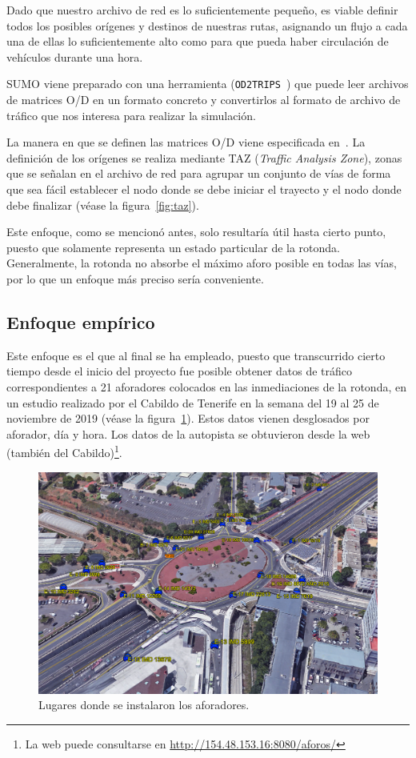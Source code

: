 Dado que nuestro archivo de red es lo suficientemente pequeño, es viable definir todos los posibles orígenes y destinos de nuestras rutas, asignando un flujo a cada una de ellas lo suficientemente alto como para que pueda haber circulación de vehículos durante una hora.

SUMO viene preparado con una herramienta (\texttt{OD2TRIPS}~\cite{noauthor_od2trips_nodate}) que puede leer archivos de matrices O/D en un formato concreto y convertirlos al formato de archivo de tráfico que nos interesa para realizar la simulación.

La manera en que se definen las matrices O/D viene especificada en~\cite{noauthor_demandimporting_nodate}. La definición de los orígenes se realiza mediante TAZ (\textit{Traffic Analysis Zone}), zonas que se señalan en el archivo de red para agrupar un conjunto de vías de forma que sea fácil establecer el nodo donde se debe iniciar el trayecto y el nodo donde debe finalizar (véase la figura~\ref{fig:taz}).

Este enfoque, como se mencionó antes, solo resultaría útil hasta cierto punto, puesto que solamente representa un estado particular de la rotonda. Generalmente, la rotonda no absorbe el máximo aforo posible en todas las vías, por lo que un enfoque más preciso sería conveniente.

\subsection{Enfoque empírico}

Este enfoque es el que al final se ha empleado, puesto que transcurrido cierto tiempo desde el inicio del proyecto fue posible obtener datos de tráfico correspondientes a 21 aforadores colocados en las inmediaciones de la rotonda, en un estudio realizado por el Cabildo de Tenerife en la semana del 19 al 25 de noviembre de 2019 (véase la figura~\ref{fig:aforadores}). Estos datos vienen desglosados por aforador, día y hora. Los datos de la autopista se obtuvieron desde la web (también del Cabildo)\footnote{La web puede consultarse en \url{http://154.48.153.16:8080/aforos/}}.

\begin{figure}[ht]
    \centering
    \includegraphics[width=\textwidth]{report/images/aforadores.png}
    \caption{Lugares donde se instalaron los aforadores.}
    \label{fig:aforadores}
\end{figure}

